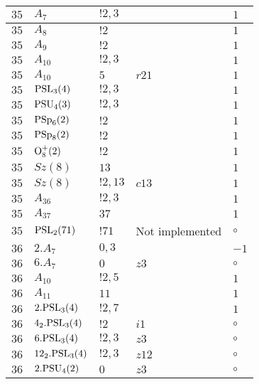 \documentclass[a4paper, 11pt]{article}
\begin{document}
\begin{longtable}{lllll}
        $ 35 $ & $ A_{7} $ & $ ! 2,3 $ & $ ~ $ & $ 1$ \\ \hline
        $ 35 $ & $ A_{8} $ & $ ! 2 $ & $ ~ $ & $ 1$ \\ \hline
        $ 35 $ & $ A_{9} $ & $ ! 2 $ & $ ~ $ & $ 1$ \\ \hline
        $ 35 $ & $ A_{10} $ & $ ! 2,3 $ & $ ~ $ & $ 1$ \\ \hline
        $ 35 $ & $ A_{10} $ & $ 5 $ & $ r21 $ & $ 1$ \\ \hline
        $ 35 $ & $ {\rm PSL}_{3}(4) $ & $ ! 2,3 $ & $ ~ $ & $ 1$ \\ \hline
        $ 35 $ & $ {\rm PSU}_{4}(3) $ & $ ! 2,3 $ & $ ~ $ & $ 1$ \\ \hline
        $ 35 $ & $ {\rm PSp}_{6}(2) $ & $ ! 2 $ & $ ~ $ & $ 1$ \\ \hline
        $ 35 $ & $ {\rm PSp}_{8}(2) $ & $ ! 2 $ & $ ~ $ & $ 1$ \\ \hline
        $ 35 $ & $ {\rm O}_{8}^+(2) $ & $ ! 2 $ & $ ~ $ & $ 1$ \\ \hline
        $ 35 $ & $ Sz(8) $ & $ 13 $ & $ ~ $ & $ 1$ \\ \hline
        $ 35 $ & $ Sz(8) $ & $ ! 2,13 $ & $ c13 $ & $ 1$ \\ \hline
        $ 35 $ & $ A_{36} $ & $ !2, 3 $ & $ ~ $ & $ 1$ \\ \hline
        $ 35 $ & $ A_{37} $ & $ 37 $ & $ ~ $ & $ 1$ \\ \hline
        $ 35 $ & $ {\rm PSL}_{2}(71) $ & $ !71 $ &  Not implemented &  $\circ$ \\ \hline
        $ 36 $ & $ 2.A_{7} $ & $ 0,3 $ & $ ~ $ & $ -1$ \\ \hline
        $ 36 $ & $ 6.A_{7} $ & $ 0 $ & $ z3 $ &  $\circ$ \\ \hline
        $ 36 $ & $ A_{10} $ & $ ! 2,5 $ & $ ~ $ & $ 1$ \\ \hline
        $ 36 $ & $ A_{11} $ & $ 11 $ & $ ~ $ & $ 1$ \\ \hline
        $ 36 $ & $ 2.{\rm PSL}_{3}(4) $ & $ ! 2,7 $ & $ ~ $ & $ 1$ \\ \hline
        $ 36 $ & $ 4_2.{\rm PSL}_{3}(4) $ & $ ! 2 $ & $ i1 $ &  $\circ$ \\ \hline
        $ 36 $ & $ 6.{\rm PSL}_{3}(4) $ & $ ! 2,3 $ & $ z3 $ &  $\circ$ \\ \hline
        $ 36 $ & $ 12_2.{\rm PSL}_{3}(4) $ & $ ! 2,3 $ & $ z12 $ &  $\circ$ \\ \hline
        $ 36 $ & $ 2.{\rm PSU}_{4}(2) $ & $ 0 $ & $ z3 $ &  $\circ$ \\ \hline

\end{longtable}
\end{document}
